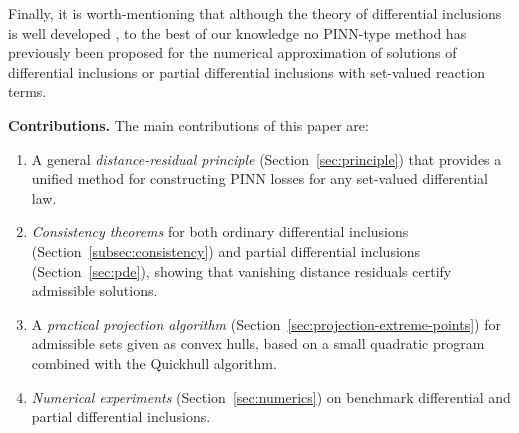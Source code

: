 \documentclass[11pt]{elsarticle}
\theoremstyle{definition}
\theoremstyle{remark}
\numberwithin{equation}{section}
\begin{document}
Finally, it is worth-mentioning that although the theory of differential inclusions is well developed \cite{aubin_cellina_1984,aubin_frankowska_2009,deimling_1992}, to the best of our knowledge no
	PINN-type method has previously been proposed for the numerical
	approximation of solutions of differential inclusions or partial
	differential inclusions with set-valued reaction terms.
	
	\vspace{0.3cm}
	
	\noindent\textbf{Contributions. }
	The main contributions of this paper are:
	\begin{enumerate}
		\item A general \emph{distance-residual principle} (Section~\ref{sec:principle})
		that provides a unified method for constructing PINN losses for any
		set-valued differential law.
		\item \emph{Consistency theorems} for both ordinary differential
		inclusions (Section~\ref{subsec:consistency}) and  partial
		differential inclusions (Section~\ref{sec:pde}), showing that
		vanishing distance residuals certify admissible solutions.
		\item A \emph{practical projection algorithm} (Section~\ref{sec:projection-extreme-points})
		for admissible sets given as convex hulls, based on a small quadratic
		program combined with the Quickhull algorithm.
		\item \emph{Numerical experiments} (Section~\ref{sec:numerics}) on
		benchmark differential and partial differential inclusions.
	\end{enumerate}
	
%	
%	
	
\end{document}
